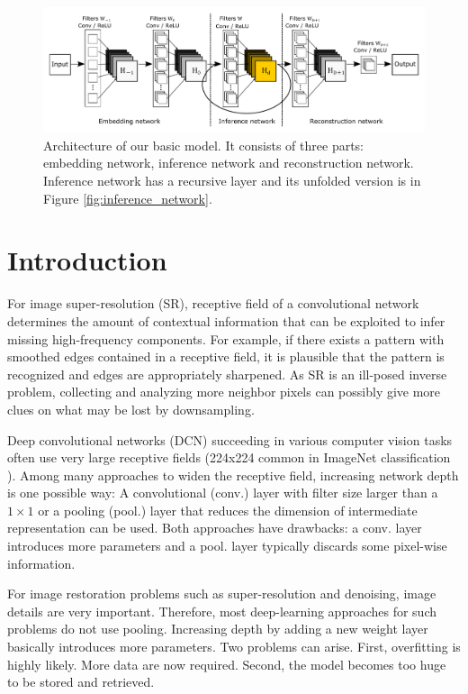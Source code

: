 \documentclass[10pt,twocolumn,letterpaper]{article}
\begin{document}
\begin{figure}[t]
	\includegraphics[width=\textwidth]{figs/f1}
	\caption {Architecture of our basic model. It consists of three parts: embedding network, inference network and reconstruction network. Inference network has a recursive layer and its unfolded version is in Figure \ref{fig:inference_network}.}
	\label{fig:overview}
\end{figure}


\section{Introduction}
For image super-resolution (SR), receptive field of a convolutional network determines the amount of contextual information that can be exploited to infer missing high-frequency components. For example, if there exists a pattern with smoothed edges contained in a receptive field, it is plausible that the pattern is recognized and edges are appropriately sharpened. As SR is an ill-posed inverse problem, collecting and analyzing more neighbor pixels can possibly give more clues on what may be lost by downsampling. 

Deep convolutional networks (DCN) succeeding in various computer vision tasks often use very large receptive fields  (224x224 common in ImageNet classification \cite{krizhevsky2012imagenet, simonyan2015very}). Among many approaches to widen the receptive field, increasing network depth is one possible way: A convolutional (conv.) layer  with filter size larger than a $1\times 1$ or a pooling (pool.) layer that reduces the dimension of intermediate representation can be used.  Both approaches have drawbacks: a conv. layer introduces more parameters and a pool. layer typically discards some pixel-wise information. 

For image restoration problems such as super-resolution and denoising, image details are very important. Therefore, most deep-learning approaches for such problems do not use pooling. Increasing depth by adding a new weight layer basically introduces more parameters. Two problems can arise. First, overfitting is highly likely. More data are now required. Second, the model becomes too huge to be stored and retrieved.
\end{document}

